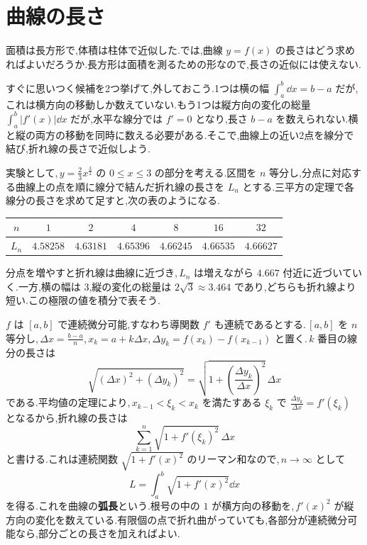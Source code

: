 \section{曲線の長さ}\label{節:曲線の弧長}

面積は長方形で,体積は柱体で近似した.では,曲線 $y=f(x)$ の長さはどう求めればよいだろうか.長方形は面積を測るための形なので,長さの近似には使えない.

すぐに思いつく候補を2つ挙げて,外しておこう.1つは横の幅 $\int_a^b\dd x=b-a$ だが,これは横方向の移動しか数えていない.もう1つは縦方向の変化の総量 $\int_a^b|f'(x)|\dd x$ だが,水平な線分では $f'=0$ となり,長さ $b-a$ を数えられない.横と縦の両方の移動を同時に数える必要がある.そこで,曲線上の近い2点を線分で結び,折れ線の長さで近似しよう.

実験として,\,$y=\frac23x^{\frac32}$ の $0\le x\le3$ の部分を考える.区間を $n$ 等分し,分点に対応する曲線上の点を順に線分で結んだ折れ線の長さを $L_n$ とする.三平方の定理で各線分の長さを求めて足すと,次の表のようになる.
\begin{center}
\begin{tabular}{ccccccc}
\toprule
$n$ & $1$ & $2$ & $4$ & $8$ & $16$ & $32$\\
\midrule
$L_n$ & $4.58258$ & $4.63181$ & $4.65396$ & $4.66245$ & $4.66535$ & $4.66627$\\
\bottomrule
\end{tabular}
\end{center}
分点を増やすと折れ線は曲線に近づき,\,$L_n$ は増えながら $4.667$ 付近に近づいていく.一方,横の幅は $3$,縦の変化の総量は $2\sqrt3\approx3.464$ であり,どちらも折れ線より短い.この極限の値を積分で表そう.

$f$ は $[a,b]$ で連続微分可能,すなわち導関数 $f'$ も連続であるとする.\,$[a,b]$ を $n$ 等分し,\,$\Delta x=\frac{b-a}{n}$,\,$x_k=a+k\Delta x$,\,$\Delta y_k=f(x_k)-f(x_{k-1})$ と置く.\,$k$ 番目の線分の長さは
\[
\sqrt{(\Delta x)^2+(\Delta y_k)^2}
 =\sqrt{1+\left(\frac{\Delta y_k}{\Delta x}\right)^2}\,\Delta x
\]
である.平均値の定理により,\,$x_{k-1}<\xi_k<x_k$ を満たすある $\xi_k$ で $\frac{\Delta y_k}{\Delta x}=f'(\xi_k)$ となるから,折れ線の長さは
\[
\sum_{k=1}^n\sqrt{1+f'(\xi_k)^2}\,\Delta x
\]
と書ける.これは連続関数 $\sqrt{1+f'(x)^2}$ のリーマン和なので,\,$n\to\infty$ として
\begin{equation}\label{式:グラフの弧長}
L=\int_a^b\sqrt{1+f'(x)^2}\dd x
\end{equation}
を得る.これを曲線の\textbf{弧長}という.根号の中の $1$ が横方向の移動を,\,$f'(x)^2$ が縦方向の変化を数えている.有限個の点で折れ曲がっていても,各部分が連続微分可能なら,部分ごとの長さを加えればよい.

